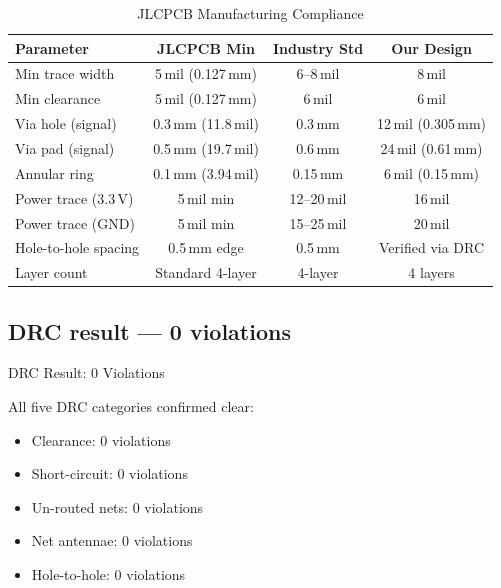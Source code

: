 \documentclass[11pt,a4paper]{article}
\begin{document}
\begin{table}[H]
  \centering
  \caption{JLCPCB Manufacturing Compliance}
  \begin{tabularx}{\linewidth}{Xccc}
    \toprule
    \textbf{Parameter} & \textbf{JLCPCB Min} & \textbf{Industry Std} & \textbf{Our Design} \\
    \midrule
    Min trace width      & 5\,mil (0.127\,mm)  & 6–8\,mil    & 8\,mil \\
    Min clearance        & 5\,mil (0.127\,mm)  & 6\,mil      & 6\,mil \\
    Via hole (signal)    & 0.3\,mm (11.8\,mil) & 0.3\,mm     & 12\,mil (0.305\,mm) \\
    Via pad (signal)     & 0.5\,mm (19.7\,mil) & 0.6\,mm     & 24\,mil (0.61\,mm) \\
    Annular ring         & 0.1\,mm (3.94\,mil) & 0.15\,mm    & 6\,mil (0.15\,mm) \\
    Power trace (3.3\,V) & 5\,mil min          & 12–20\,mil  & 16\,mil \\
    Power trace (GND)    & 5\,mil min          & 15–25\,mil  & 20\,mil \\
    Hole-to-hole spacing & 0.5\,mm edge        & 0.5\,mm     & Verified via DRC \\
    Layer count          & Standard 4-layer    & 4-layer     & 4 layers \\
    \bottomrule
  \end{tabularx}
  \label{tab:compliance}
\end{table}

\subsection{DRC result — 0 violations}

\begin{center}
  \begin{tcolorbox}[colback=passgreen!10, colframe=passgreen,
      width=0.55\linewidth, halign=center, fontupper=\large\bfseries]
    DRC Result: \textcolor{passgreen}{0 Violations}
  \end{tcolorbox}
\end{center}

\vspace{0.2cm}
All five DRC categories confirmed clear:
\begin{itemize}[leftmargin=2em, noitemsep]
  \item[\textcolor{passgreen}{\checkmark}] Clearance: 0 violations
  \item[\textcolor{passgreen}{\checkmark}] Short-circuit: 0 violations
  \item[\textcolor{passgreen}{\checkmark}] Un-routed nets: 0 violations
  \item[\textcolor{passgreen}{\checkmark}] Net antennae: 0 violations
  \item[\textcolor{passgreen}{\checkmark}] Hole-to-hole: 0 violations
\end{itemize}
\end{document}

